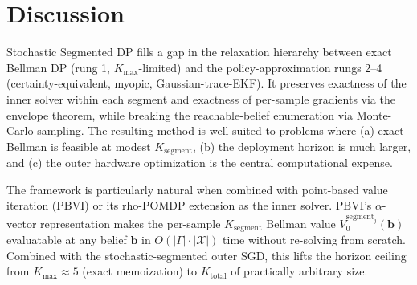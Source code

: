 \documentclass[11pt,a4paper]{article}
\newcommand{\bb}{\bm{b}}
\begin{document}
\section{Discussion}
\label{sec:discussion}

Stochastic Segmented DP fills a gap in the relaxation hierarchy between exact Bellman DP
(rung 1, $K_\mathrm{max}$-limited) and the policy-approximation rungs 2--4
(certainty-equivalent, myopic, Gaussian-trace-EKF).  It preserves exactness of the inner
solver within each segment and exactness of per-sample gradients via the envelope theorem,
while breaking the reachable-belief enumeration via Monte-Carlo sampling.  The resulting
method is well-suited to problems where (a) exact Bellman is feasible at modest
$K_\mathrm{segment}$, (b) the deployment horizon is much larger, and (c) the outer hardware
optimization is the central computational expense.

The framework is particularly natural when combined with point-based value iteration
(PBVI) or its rho-POMDP extension as the inner solver.  PBVI's $\alpha$-vector
representation makes the per-sample $K_\mathrm{segment}$ Bellman value $V_0^{\mathrm{segment}_j}(\bb)$
evaluatable at any belief $\bb$ in $O(|\Gamma| \cdot |\mathcal{X}|)$ time without
re-solving from scratch.  Combined with the stochastic-segmented outer SGD, this lifts the
horizon ceiling from $K_\mathrm{max} \approx 5$ (exact memoization) to $K_\mathrm{total}$
of practically arbitrary size.
\end{document}

